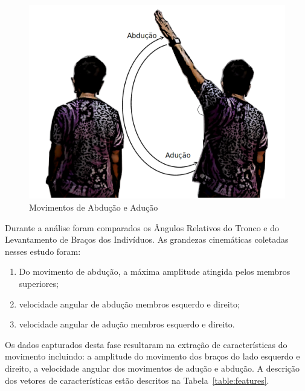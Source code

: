 \begin{figure}[!htbp]
 \centering
 \includegraphics[scale=0.25]{./img/movaddcutctionartist2.png}
\caption{Movimentos de Abdução e Adução}
 \label{fig:movabducaomet}
\end{figure}

Durante a análise foram comparados os Ângulos Relativos do Tronco e do Levantamento de Braços dos Indivíduos. As grandezas cinemáticas coletadas nesses estudo foram:
\begin{enumerate}
	\item Do movimento de abdução, a máxima amplitude atingida pelos membros superiores;
	\item velocidade angular de abdução membros esquerdo e direito;
	\item velocidade angular de adução membros esquerdo e direito.
\end{enumerate}

Os dados capturados desta fase resultaram na extração de características do movimento incluindo: a amplitude do movimento dos braços do lado esquerdo e direito, a velocidade angular dos movimentos de adução e abdução. A descrição dos vetores de características estão descritos na Tabela~\ref{table:features}.


